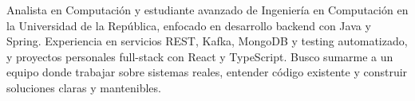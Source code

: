 \documentclass[letter,10pt]{article}
\begin{document}
Analista en Computación y estudiante avanzado de Ingeniería en Computación en la Universidad de la República, enfocado en desarrollo backend con Java y Spring. Experiencia en servicios REST, Kafka, MongoDB y testing automatizado, y proyectos personales full-stack con React y TypeScript. Busco sumarme a un equipo donde trabajar sobre sistemas reales, entender código existente y construir soluciones claras y mantenibles.
\end{document}
